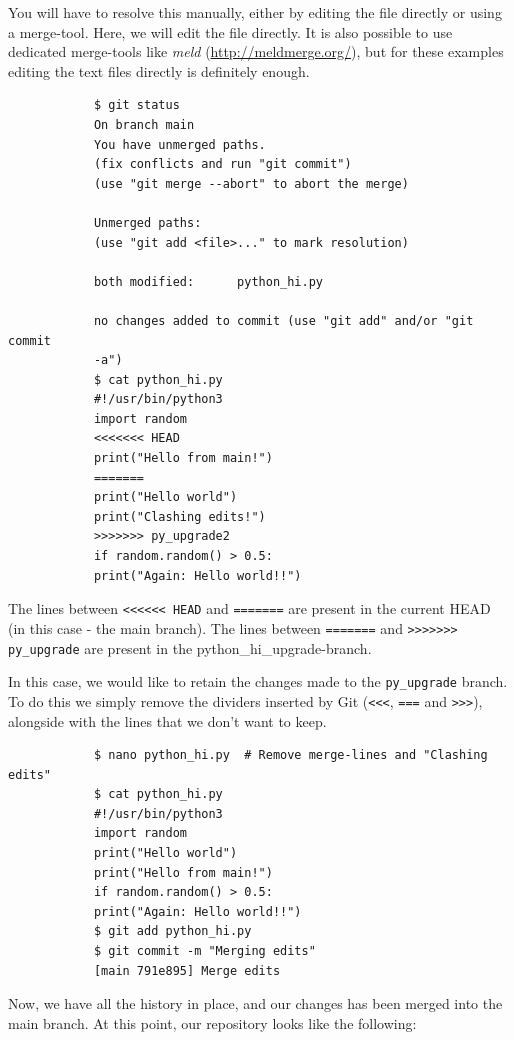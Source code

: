 \documentclass[../main/git_course_main.tex]{subfiles}
\begin{document}
	You will have to
	resolve this manually, either by editing the file directly or using a merge-tool.
	Here, we will edit the file directly. It is also possible to use dedicated merge-tools like \textit{meld} (\url{http://meldmerge.org/}), but for these examples editing the text files directly is definitely enough. 
	
	\begin{codebox}
		\begin{lstlisting}
			$ git status
			On branch main
			You have unmerged paths.
			(fix conflicts and run "git commit")
			(use "git merge --abort" to abort the merge)
			
			Unmerged paths:
			(use "git add <file>..." to mark resolution)
			
			both modified:      python_hi.py
			
			no changes added to commit (use "git add" and/or "git commit 
			-a")
			$ cat python_hi.py
			#!/usr/bin/python3
			import random
			<<<<<<< HEAD
			print("Hello from main!")
			=======
			print("Hello world")
			print("Clashing edits!")
			>>>>>>> py_upgrade2
			if random.random() > 0.5:
			print("Again: Hello world!!")
		\end{lstlisting}
	\end{codebox}
	
	The lines between \verb$<<<<<< HEAD$ and \verb$=======$ are present in the current HEAD (in this case - the main branch). The lines between \verb$=======$ and \verb$>>>>>>> py_upgrade$ are present in the python\_hi\_upgrade-branch.
	
	In this case, we would like to retain the changes made to the \verb$py_upgrade$ branch. To do this we simply remove the dividers inserted by Git (\verb$<<<$, \verb$===$ and \verb$>>>$), alongside with the lines that we don't want to keep.
	
	\begin{codebox}
		\begin{lstlisting}
			$ nano python_hi.py  # Remove merge-lines and "Clashing edits"
			$ cat python_hi.py
			#!/usr/bin/python3
			import random
			print("Hello world")
			print("Hello from main!")
			if random.random() > 0.5:
			print("Again: Hello world!!")
			$ git add python_hi.py
			$ git commit -m "Merging edits"
			[main 791e895] Merge edits
		\end{lstlisting}
	\end{codebox}
	
	Now, we have all the history in place, and our changes has been merged into the main branch.
	At this point, our repository looks like the following:
	
\end{document}

